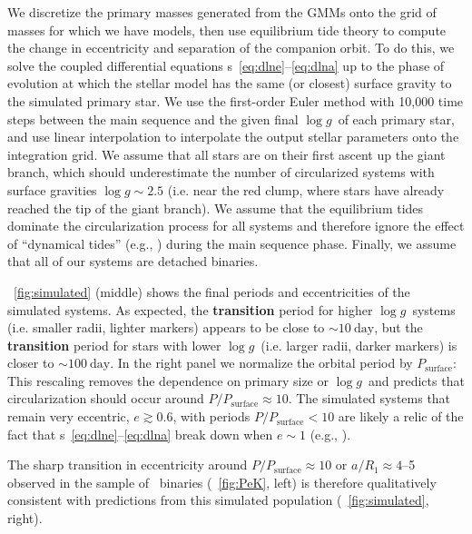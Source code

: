 \documentclass[modern, letterpaper]{aastex62}
\newcommand{\apogee}{\project{\acronym{APOGEE}}}
\newcommand{\logg}{\ensuremath{\log g}}
\newcommand{\Psurf}{\ensuremath{P_\textrm{surface}}}
\renewcommand{\changes}[1]{\textbf{#1}}
\begin{document}
We discretize the primary masses generated from the GMMs onto the grid of masses
for which we have  models, then use equilibrium tide theory to
compute the change in eccentricity and separation of the companion orbit.
To do this, we solve the coupled differential equations \eqname
s~\ref{eq:dlne}--\ref{eq:dlna} up to the phase of evolution at which the stellar
model has the same (or closest) surface gravity to the simulated primary star.
We use the first-order Euler method with 10,000 time steps between the main
sequence and the given final \logg\ of each primary star, and use linear
interpolation to interpolate the  output stellar parameters onto
the integration grid.
We assume that all stars are on their first ascent up the giant branch, which
should underestimate the number of circularized systems with surface gravities
$\logg \sim 2.5$ (i.e. near the red clump, where stars have already reached the
tip of the giant branch).
We assume that the equilibrium tides dominate the circularization process for
all systems and therefore ignore the effect of ``dynamical tides''
(e.g., \citealt{Goodman:1998}) during the main sequence phase.
Finally, we assume that all of our systems are detached binaries.

\figurename~\ref{fig:simulated} (middle) shows the final periods and
eccentricities of the simulated systems.
As expected, the \changes{transition} period for higher \logg\ systems (i.e.
smaller radii, lighter markers) appears to be close to $\sim 10~\textrm{day}$,
but the \changes{transition} period for stars with lower \logg\ (i.e. larger
radii, darker markers) is closer to $\sim 100~\textrm{day}$.
In the right panel we normalize the orbital period by \Psurf:
This rescaling removes the dependence on primary size or \logg\ and predicts
that circularization should occur around $P / \Psurf \approx 10$.
The simulated systems that remain very eccentric, $e \gtrsim 0.6$, with periods
$P / \Psurf < 10$ are likely a relic of the fact that \eqname
s~\ref{eq:dlne}--\ref{eq:dlna} break down when $e \sim 1$ (e.g.,
\citealt{Hut:1981}).

The sharp transition in eccentricity around $P/\Psurf \approx 10$ or $a/R_1
\approx 4$--5 observed in the sample of \apogee\ binaries
(\figurename~\ref{fig:PeK}, left) is therefore qualitatively consistent with
predictions from this simulated population (\figurename~\ref{fig:simulated},
right).
\end{document}
